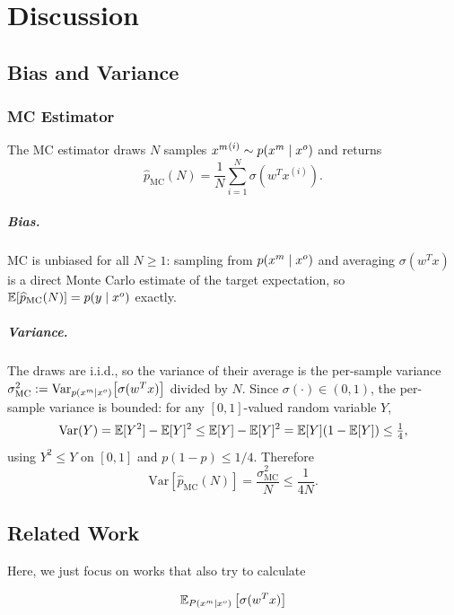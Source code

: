 \chapter{Discussion}
\label{cha:discussion}

\section{Bias and Variance}
\label{sec:bias-variance}



\subsection{MC Estimator}

The MC estimator draws $N$ samples ${x^m}^{(i)} \sim p(x^m \mid x^o)$ and returns
\[
  \widehat{p}_{\mathrm{MC}}(N) = \frac{1}{N}\sum_{i=1}^{N} \sigma\!\left(w^T x^{(i)}\right).
\]
\paragraph{Bias.}
MC is unbiased for all $N \geq 1$: sampling from $p(x^m \mid x^o)$ and averaging $\sigma(w^T x)$ is a direct Monte Carlo estimate of the target expectation, so $\mathbb{E}[\widehat{p}_{\mathrm{MC}}(N)] = p(y \mid x^o)$ exactly.

\paragraph{Variance.}
The draws are i.i.d., so the variance of their average is the per-sample variance
$\sigma^2_{\mathrm{MC}} := \mathrm{Var}_{p(x^m\mid x^o)}\!\left[\sigma(w^T x)\right]$
divided by $N$. Since $\sigma(\cdot) \in (0,1)$, the per-sample variance is bounded:
for any $[0,1]$-valued random variable $Y$,
\[
  \mathrm{Var}(Y) = \mathbb{E}[Y^2] - \mathbb{E}[Y]^2 \leq \mathbb{E}[Y] - \mathbb{E}[Y]^2 = \mathbb{E}[Y](1-\mathbb{E}[Y]) \leq \tfrac{1}{4},
\]
using $Y^2 \leq Y$ on $[0,1]$ and $p(1-p) \leq 1/4$. Therefore
\[
  \mathrm{Var}\!\left[\widehat{p}_{\mathrm{MC}}(N)\right] = \frac{\sigma^2_{\mathrm{MC}}}{N} \leq \frac{1}{4N}.
\]

\section{Related Work}

Here, we just focus on works that also try to calculate 

\[
  \mathbb{E}_{P(x^m \mid x^o)} \left[\sigma(w^T x)\right]
\]

